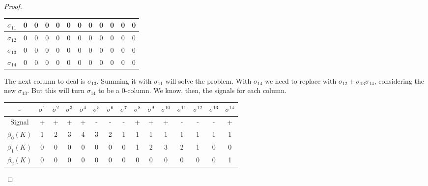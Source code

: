 \begin{proof}
\begin{enumerate}
\begin{center}
\begin{tabular}{|c|c|c|c|c|c|c|c|c|c|c|c|}
            $\sigma_{11}$ & 0                  & 0          & 0          & 0          & 0          & 0          & 0             & 0             & 0             & 0             & 0             \\ \hline
            $\sigma_{12}$ & 0                  & 0          & 0          & 0          & 0          & 0          & 0             & 0             & 0             & 0             & 0             \\ \hline
            $\sigma_{13}$ & 0                  & 0          & 0          & 0          & 0          & 0          & 0             & 0             & 0             & 0             & 0             \\ \hline
            $\sigma_{14}$ & 0                  & 0          & 0          & 0          & 0          & 0          & 0             & 0             & 0             & 0             & 0             \\ \hline
        \end{tabular}
    \end{center}

    The next column to deal is $\sigma_{13}$. Summing it with $\sigma_{11}$
    will solve the problem. With $\sigma_{14}$ we need to replace with
    $\sigma_{12} + \sigma_{13} \sigma_{14}$, considering the new
    $\sigma_{13}$. But this will turn $\sigma_{14}$ to be a 0-column. We know,
    then, the signals for each column. 

    \begin{center}
        \begin{tabular}{ c|c|c|c|c|c|c|c|c|c|c|c|c|c|c}
         - & $\sigma^1$ & $\sigma^2$ & $\sigma^3$ & $\sigma^4$ & $\sigma^5$ &
         $\sigma^6$ & $\sigma^7$ &$\sigma^8$ &$\sigma^9$ &$\sigma^{10}$
         &$\sigma^{11}$ &$\sigma^{12}$ &$\sigma^{13}$ &$\sigma^{14}$ \\ 
         \hline
         Signal & + & + & + & + & - & - & - & + & + & + & - & - & - & + \\  
         $\beta_0(K)$ & 1 & 2 & 3 & 4 & 3 & 2 & 1 & 1 & 1 & 1 & 1 & 1 & 1 & 1\\ 
         $\beta_1(K)$ & 0 & 0 & 0 & 0 & 0 & 0 & 0 & 1 & 2 & 3 & 2 & 1 & 0 & 0 \\     
         $\beta_2(K)$ & 0 & 0 & 0 & 0 & 0 & 0 & 0 & 0 & 0 & 0 & 0 & 0 & 0 & 1\\     

        \end{tabular}
    \end{center}

\end{enumerate}

\end{proof}